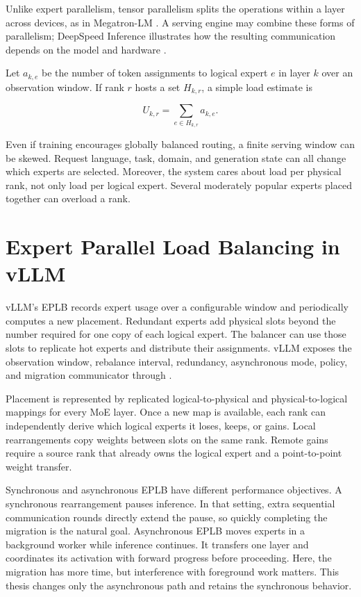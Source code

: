 Unlike expert parallelism, tensor parallelism splits the operations within a
layer across devices, as in Megatron-LM \cite{shoeybi2019megatron}. A serving
engine may combine these forms of parallelism; DeepSpeed Inference illustrates
how the resulting communication depends on the model and hardware
\cite{aminabadi2022deepspeedinference}.

Let $a_{k,e}$ be the number of token assignments to logical expert $e$ in layer
$k$ over an observation window. If rank $r$ hosts a set $H_{k,r}$, a simple
load estimate is

\begin{equation}
  U_{k,r}=\sum_{e\in H_{k,r}} a_{k,e}.
\end{equation}

Even if training encourages globally balanced routing, a finite serving window
can be skewed. Request language, task, domain, and generation state can all
change which experts are selected. Moreover, the system cares about load per
physical rank, not only load per logical expert. Several moderately popular
experts placed together can overload a rank.

\section{Expert Parallel Load Balancing in vLLM}

vLLM's EPLB records expert usage over a configurable window and periodically
computes a new placement. Redundant experts add physical slots beyond the
number required for one copy of each logical expert. The balancer can use those
slots to replicate hot experts and distribute their assignments. vLLM exposes
the observation window, rebalance interval, redundancy, asynchronous mode,
policy, and migration communicator through 
\cite{vllmeplbdocs}.

Placement is represented by replicated logical-to-physical and
physical-to-logical mappings for every MoE layer. Once a new map is available,
each rank can independently derive which logical experts it loses, keeps, or
gains. Local rearrangements copy weights between slots on the same rank.
Remote gains require a source rank that already owns the logical expert and a
point-to-point weight transfer.

Synchronous and asynchronous EPLB have different performance objectives. A
synchronous rearrangement pauses inference. In that setting, extra sequential
communication rounds directly extend the pause, so quickly completing the
migration is the natural goal. Asynchronous EPLB moves experts in a background
worker while inference continues. It transfers one layer and coordinates its
activation with forward progress before proceeding. Here, the migration has
more time, but interference with foreground work matters. This thesis changes
only the asynchronous path and retains the synchronous behavior.

